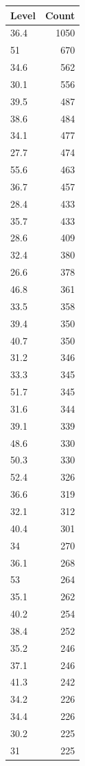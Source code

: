 \begin{table}[ht]
\centering
\begin{tabular}{lr}
  \hline
Level & Count \\ 
  \hline
36.4 & 1050 \\ 
  51 & 670 \\ 
  34.6 & 562 \\ 
  30.1 & 556 \\ 
  39.5 & 487 \\ 
  38.6 & 484 \\ 
  34.1 & 477 \\ 
  27.7 & 474 \\ 
  55.6 & 463 \\ 
  36.7 & 457 \\ 
  28.4 & 433 \\ 
  35.7 & 433 \\ 
  28.6 & 409 \\ 
  32.4 & 380 \\ 
  26.6 & 378 \\ 
  46.8 & 361 \\ 
  33.5 & 358 \\ 
  39.4 & 350 \\ 
  40.7 & 350 \\ 
  31.2 & 346 \\ 
  33.3 & 345 \\ 
  51.7 & 345 \\ 
  31.6 & 344 \\ 
  39.1 & 339 \\ 
  48.6 & 330 \\ 
  50.3 & 330 \\ 
  52.4 & 326 \\ 
  36.6 & 319 \\ 
  32.1 & 312 \\ 
  40.4 & 301 \\ 
  34 & 270 \\ 
  36.1 & 268 \\ 
  53 & 264 \\ 
  35.1 & 262 \\ 
  40.2 & 254 \\ 
  38.4 & 252 \\ 
  35.2 & 246 \\ 
  37.1 & 246 \\ 
  41.3 & 242 \\ 
  34.2 & 226 \\ 
  34.4 & 226 \\ 
  30.2 & 225 \\ 
  31 & 225 \\ 

\end{tabular}
\end{table}
